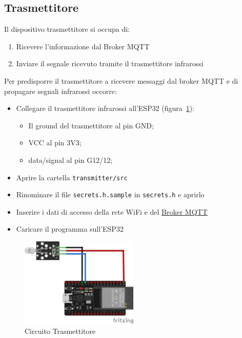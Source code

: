 \documentclass[a4paper,11pt]{article}
\begin{document}
    \subsection{Trasmettitore}
    \label{subsec:transmitter}

    Il dispositivo trasmettitore si occupa di:

    \begin{enumerate}
      \item Ricevere l'informazione dal Broker MQTT
      \item Inviare il segnale ricevuto tramite il trasmettitore infrarossi
    \end{enumerate}

    Per predisporre il trasmettitore a ricevere messaggi dal broker MQTT e di propagare segnali infrarossi occorre:

    \begin{itemize}
      \item Collegare il trasmettitore infrarossi all'ESP32 (figura~\ref{fig:circuito_trasmettitore}):
        \begin{itemize}
          \item Il ground del trasmettitore al pin GND;
          \item VCC al pin 3V3;
          \item data/signal al pin G12/12;
        \end{itemize}


      \item Aprire la cartella \texttt{transmitter/src}
      \item Rinominare il file \texttt{secrets.h.sample} in \texttt{secrets.h} e aprirlo
      \item Inserire i dati di accesso della rete WiFi e del \hyperref[subsec:Broker]{Broker MQTT}
      \item Caricare il programma sull'ESP32
    \end{itemize}

    \begin{figure}[H]
      \centering
      \includegraphics[width=0.5\textwidth,height=\textheight,keepaspectratio]{assets/transmitter_fritzing}
      \caption{Circuito Trasmettitore}
      \label{fig:circuito_trasmettitore}
    \end{figure}
\end{document}
